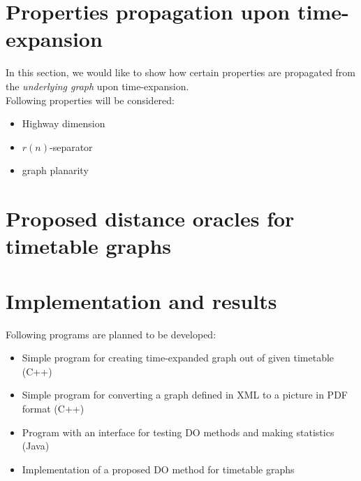 \documentclass[a4paper]{article}
\newenvironment{itemizesp}
{
    \begin{itemize}
}
{
    \end{itemize}
}
\begin{document}


    \pagebreak


    \section{Properties propagation upon time-expansion}
    In this section, we would like to show how certain properties are propagated from the \emph{underlying graph} upon time-expansion. \\

    \noindent Following properties will be considered:

    \begin{itemizesp}
        \item Highway dimension
        \item $r(n)$-separator
        \item graph planarity
    \end{itemizesp}

    \pagebreak


    \section{Proposed distance oracles for timetable graphs}

    \pagebreak


    \section{Implementation and results}
    Following programs are planned to be developed:

    \begin{itemizesp}
        \item Simple program for creating time-expanded graph out of given timetable (C++)
        \item Simple program for converting a graph defined in XML to a picture in PDF format (C++)
        \item Program with an interface for testing DO methods and making statistics (Java)
        \item Implementation of a proposed DO method for timetable graphs
    \end{itemizesp}
\end{document}
